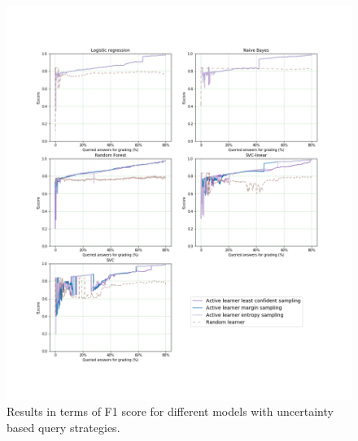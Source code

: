 	\begin{figure}[!htb]
		\centering
		\includegraphics[scale=0.46]{images/binary/task1_f1score_uncertainty}
		\caption{Results in terms of F1 score for different models with uncertainty based query strategies.}
		\label{t1_b_uncertainty_f1}
	\end{figure}
	
